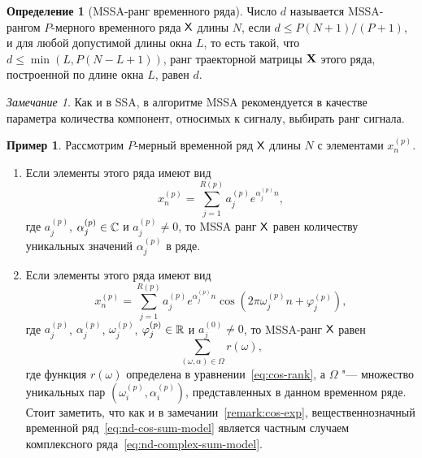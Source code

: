 \documentclass[specialist,
  substylefile=spbu_report.rtx,
subf,href,colorlinks=true, 12pt]{disser}
\theoremstyle{plain}
\theoremstyle{definition}
\newtheorem{definition}{Определение}[section]
\newtheorem{example}{Пример}[section]
\theoremstyle{remark}
\newtheorem{remark}{Замечание}[section]
\begin{document}
\begin{definition}[MSSA-ранг временного ряда]
  \label{def:mssa-rank}
  Число $d$ называется MSSA-рангом $P$-мерного временного ряда $\mathsf{X}$
  длины $N$, если $d \leqslant P(N+1) / (P+1)$,
  и для любой допустимой
  длины окна $L$,
  то есть такой, что $d \leqslant \min(L, P(N- L + 1))$, ранг
  траекторной матрицы $\mathbf{X}$ этого ряда,
  построенной по длине окна $L$, равен $d$.
\end{definition}
\begin{remark}
  Как и в SSA, в алгоритме MSSA рекомендуется в качестве параметра
  количества компонент, относимых к сигналу,
  выбирать ранг сигнала.
\end{remark}
\begin{example}
  \label{ex:mssa-ranks}
  Рассмотрим $P$-мерный временной ряд $\mathsf{X}$ длины $N$ с элементами
  $x_n^{(p)}$.
  \begin{enumerate}
    \item\label{enum:mssa-ranks-complex} Если элементы этого ряда имеют вид
      \begin{equation}
        \label{eq:nd-complex-sum-model}
        x_n^{(p)} = \sum_{j=1}^{R(p)} a_j^{(p)} e^{\alpha_j^{(p)} n},
      \end{equation}
      где $a_j^{(p)}$, $\alpha_j^{(p)} \in \mathbb{C}$ и $a_j^{(p)} \ne 0$,
      то MSSA ранг $\mathsf{X}$ равен количеству уникальных значений $\alpha_j^{(p)}$
      в ряде.
    \item\label{enum:mssa-ranks-real} Если элементы этого ряда имеют вид
      \begin{equation}
        \label{eq:nd-cos-sum-model}
        x_n^{(p)} = \sum_{j=1}^{R(p)} a_j^{(p)} e^{\alpha_j^{(p)} n}
        \cos\left(2 \pi \omega_j^{(p)} n + \varphi_j^{(p)}\right),
      \end{equation}
      где $a_j^{(p)}$, $\alpha_j^{(p)}$, $\omega_j^{(p)}$,
      $\varphi_j^{(p)} \in \mathbb{R}$ и $a_j^{(0)} \ne 0$,
      то MSSA-ранг $\mathsf{X}$ равен
      \begin{equation*}
        \sum_{(\omega, \alpha)\in \Omega} r(\omega),
      \end{equation*}
      где функция $r(\omega)$ определена в уравнении~\eqref{eq:cos-rank},
      а $\Omega$ "--- множество уникальных пар
      \linebreak $\left(\omega_i^{(p)}, \alpha_i^{(p)}\right)$,
      представленных в данном временном ряде.
      Стоит заметить, что как и в замечании~\ref{remark:cos-exp},
      вещественнозначный временной ряд~\eqref{eq:nd-cos-sum-model}
      является частным случаем комплексного
      ряда~\eqref{eq:nd-complex-sum-model}.
  \end{enumerate}
\end{example}
\end{document}
